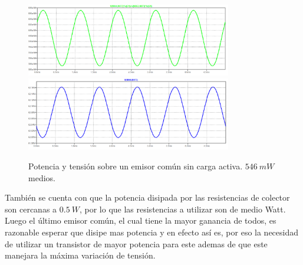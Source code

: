 \begin{figure}[H]
	\centering
	\includegraphics[width=0.8\textwidth]{ImagenesSimulaciones/PEC1.png}
		\includegraphics[width=0.8\textwidth]{ImagenesSimulaciones/VEC1.png}
	\caption{Potencia y tensión sobre un emisor común sin carga activa. $546 \ mW$ medios.}
	\label{fig:pec1}
\end{figure}

También se cuenta con que la potencia disipada por las resistencias de colector son cercanas a $0.5 \ W$, por lo que las resistencias a utilizar son de medio Watt. Luego el último emisor común, el cual tiene la mayor ganancia de todos, es razonable esperar que disipe mas potencia y en efecto así es, por eso la necesidad de utilizar un transistor de mayor potencia para este ademas de que este manejara la máxima variación de tensión.

